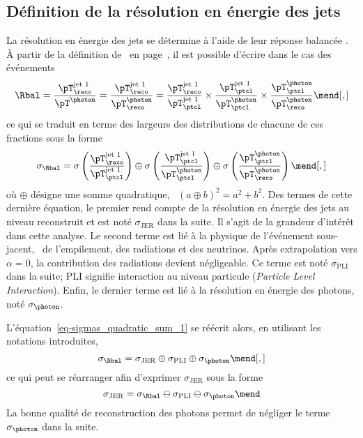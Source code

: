 \subsection{Définition de la résolution en énergie des jets}\label{chapter-JERC-section-JER-subsec-JER_definition}
La résolution en énergie des jets se détermine à l'aide de leur réponse balancée \Rbal.
À partir de la définition de \Rbal\ en page~\pageref{eq-chapter-JERC-section-CMS-subsec-residuals-Rbal_def}, il est possible d'écrire dans le cas des événements \Gjets
\begin{equation}
\Rbal
= \frac{\pT_\reco^\text{jet 1}}{\pT^{\photon}}
= \frac{\pT_\reco^\text{jet 1}}{\pT^{\photon}_\reco}
=
\frac{\pT_\reco^\text{jet 1}}{\pT^\text{jet 1}_\ptcl}
\times
\frac{\pT^\text{jet 1}_\ptcl}{\pT^{\photon}_\ptcl}
\times
\frac{\pT^{\photon}_\ptcl}{\pT^{\photon}_\reco}
\mend[,]
\end{equation}
ce qui se traduit en terme des largeurs des distributions de chacune de ces fractions sous la forme
\begin{equation}
\sigma_{\Rbal}
=
\sigma\left(\frac{\pT_\reco^\text{jet 1}}{\pT^\text{jet 1}_\ptcl}\right)
\oplus
\sigma\left(\frac{\pT^\text{jet 1}_\ptcl}{\pT^{\photon}_\ptcl}\right)
\oplus
\sigma\left(\frac{\pT^{\photon}_\ptcl}{\pT^{\photon}_\reco} \vphantom{\frac{\pT^\text{jet 1}_\ptcl}{\pT^{\photon}_\ptcl}}\right)
\label{eq-sigmas_quadratic_sum_1}
\mend[,]
\end{equation}
où $\oplus$ désigne une somme quadratique, \ie\ $(a\oplus b)^2 = a^2 + b^2$.
Des termes de cette dernière équation, le premier rend compte de la résolution en énergie des jets au niveau reconstruit et est noté $\sigma_\text{JER}$ dans la suite.
Il s'agit de la grandeur d'intérêt dans cette analyse.
Le second terme est lié à la physique de l'événement sous-jacent, \ie\ de l'empilement, des radiations et des neutrinos.
Après extrapolation vers $\alpha=0$, la contribution des radiations devient négligeable.
Ce terme est noté $\sigma_\text{PLI}$ dans la suite; \og PLI \fg{} signifie interaction au niveau particule (\emph{Particle Level Interaction}).
Enfin, le dernier terme est lié à la résolution en énergie des photons, noté $\sigma_{\photon}$.
\par L'équation~\eqref{eq-sigmas_quadratic_sum_1} se réécrit alors, en utilisant les notations introduites,
\begin{equation}
\sigma_{\Rbal}
=
\sigma_\text{JER}
\oplus
\sigma_\text{PLI}
\oplus
\sigma_{\photon}
\label{eq-sigmas_quadratic_sum_2}
\mend[,]
\end{equation}
ce qui peut se réarranger afin d'exprimer $\sigma_\text{JER}$ sous la forme
\begin{equation}
\sigma_\text{JER}
=
\sigma_{\Rbal}
\ominus
\sigma_\text{PLI}
\ominus
\sigma_{\photon}
\label{eq-sigmas_quadratic_sum_3}
\mend
\end{equation}
La bonne qualité de reconstruction des photons permet de négliger le terme $\sigma_{\photon}$ dans la suite.
